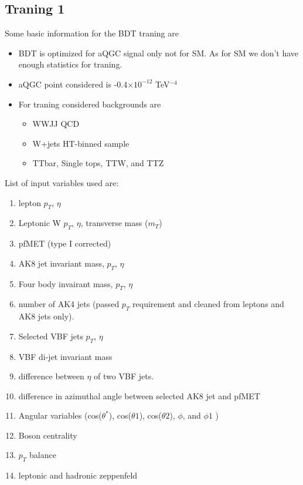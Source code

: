 \subsection{Traning 1}
Some basic information for the BDT traning are
\begin{itemize}
	\item BDT is optimized for aQGC signal only not for SM. As for SM we don't have enough statistics for traning.
	\item aQGC point considered is -0.4$\times 10^{-12}$ TeV$^{-4}$
	\item For traning considered backgrounds are
	\begin{itemize}
		\item WWJJ QCD
		\item W+jets HT-binned sample
		\item TTbar, Single tops, TTW, and TTZ
	\end{itemize}
\end{itemize}
List of input variables used are:
\begin{enumerate}
	\item lepton $p_T$, $\eta$
	\item Leptonic W $p_T$, $\eta$, transverse mass ($m_T$)
	\item pfMET (type I corrected)
	\item AK8 jet invariant mass, $p_T$, $\eta$
	\item Four body invairant mass, $p_T$, $\eta$
	\item number of AK4 jets (passed $p_T$ requirement and cleaned from leptons and AK8 jets only).
	\item Selected VBF jets $p_T$, $\eta$
	\item VBF di-jet invariant mass
	\item difference between $\eta$ of two VBF jets.
	\item difference in azimuthal angle between selected AK8 jet and pfMET
	\item Angular variables (cos($\theta^*$), cos($\theta 1$), cos($\theta 2$), $\phi$, and $\phi 1$   )
	\item Boson centrality
	\item $p_T$ balance
	\item leptonic and hadronic zeppenfeld
\end{enumerate}


